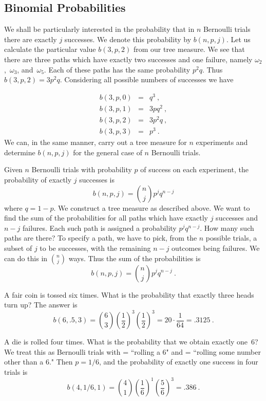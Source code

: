 \subsection*{Binomial Probabilities}

We shall be particularly interested in the probability that in $n$ Bernoulli trials
there are exactly $j$ successes.  We denote this probability by
$b(n,p,j)$.  Let us calculate the particular value $b(3,p,2)$ from our tree measure. 
We see that there are three paths which have exactly two successes and one failure,
namely $\omega_2$,~$\omega_3$, and~$\omega_5$.  Each of these paths has the same
probability $p^2q$.  Thus $b(3,p,2) = 3p^2q$.  Considering all possible numbers of
successes we have

\begin{eqnarray*} 
b(3,p,0) &=& q^3\ ,\\
b(3,p,1) &=& 3pq^2\ ,\\ 
b(3,p,2) &=& 3p^2q\ ,\\
b(3,p,3) &=& p^3\ .
\end{eqnarray*}
We can, in the same manner, carry out a tree measure for $n$ experiments and determine
$b(n,p,j)$ for the general case of $n$ Bernoulli trials.

\begin{theorem}\label{thm 3.8} Given $n$ Bernoulli trials with probability $p$ of
success on each experiment, the probability of exactly $j$ successes is
$$ b(n,p,j) = {n \choose j} p^j q^{n - j}
$$ where $q = 1 - p$.
\proof We construct a tree measure as described above.  We want to find the sum of the
probabilities for all paths which have exactly $j$ successes and $n - j$ failures. 
Each such path is assigned a probability $p^j q^{n - j}$.  How many such paths are
there?  To specify a path, we have to pick, from the $n$ possible trials, a subset of
$j$ to be successes, with the remaining $n-j$ outcomes being failures.  We can do this
in
$n \choose j$ ways.   Thus the sum of the probabilities is
$$ b(n,p,j) = {n \choose j} p^j q^{n - j}\ .
$$
\end{theorem}

\begin{example}\label{exam 3.10} A fair coin is tossed six times.  What is the
probability that exactly three heads turn up?  The answer is
$$ b(6,.5,3) = {6 \choose 3} \left(\frac12\right)^3 \left(\frac12\right)^3 = 20 \cdot
\frac1{64} = .3125\ .
$$
\end{example}

\begin{example}\label{exam 3.11} A die is rolled four times.  What is the probability
that we obtain exactly one~6?  We treat this as Bernoulli trials with 
= ``rolling a 6" and  = ``rolling some number other than a 6."  Then
$p = 1/6$, and the probability of exactly one success in four trials is
$$ b(4,1/6,1) = {4 \choose 1 }\left(\frac16\right)^1 \left(\frac56\right)^3 = .386\ .
$$
\end{example}

